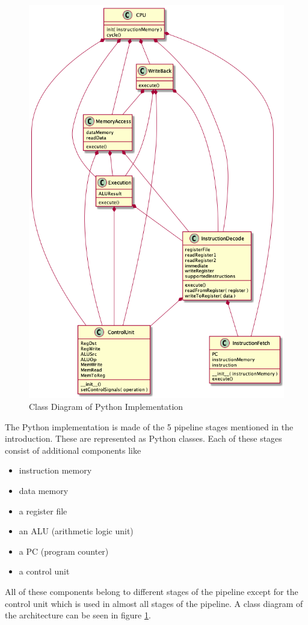 \documentclass[conference]{IEEEtran}
\begin{document}
\begin{figure}
    \centering
    \includegraphics[scale=.4]{architecture.png}
    \caption{Class Diagram of Python Implementation}
    \label{fig:class_diagram}
\end{figure}

The Python implementation is made of the 5 pipeline stages mentioned in the introduction.  These are represented as Python classes.  Each of these stages consist of additional components like
\begin{itemize}
    \item instruction memory
    \item data memory
    \item a register file
    \item an ALU (arithmetic logic unit)
    \item a PC (program counter)
    \item a control unit
\end{itemize}
All of these components belong to different stages of the pipeline except for the control unit which is used in almost all stages of the pipeline.  A class diagram of the architecture can be seen in figure \ref{fig:class_diagram}.
\end{document}
